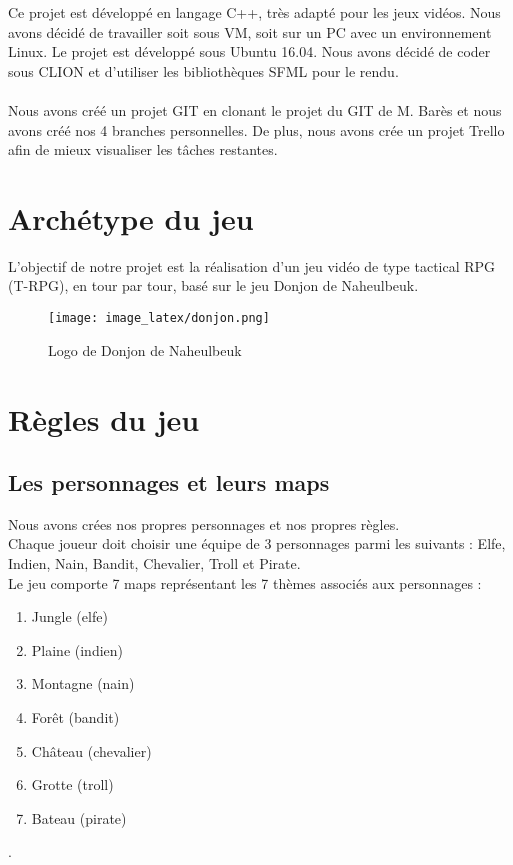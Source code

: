 \documentclass[a4paper,12pt]{report}
\begin{document}
		Ce projet est développé en langage C++, très adapté pour les jeux vidéos. Nous avons décidé de travailler soit sous VM, soit sur un PC avec un environnement Linux. Le projet est développé sous Ubuntu 16.04. Nous avons décidé de coder sous CLION et d'utiliser les bibliothèques SFML pour le rendu. \\ \\

		Nous avons créé un projet GIT en clonant le projet du GIT de M. Barès et nous avons créé nos 4 branches personnelles.
		De plus, nous avons crée un projet Trello afin de mieux visualiser les tâches restantes.
	
	
	
	
	
	\section{Archétype du jeu}
	L'objectif de notre projet est la réalisation d'un jeu vidéo de type tactical RPG (T-RPG), en tour par tour, basé sur le jeu Donjon de Naheulbeuk. 
	
	\begin{figure}[h]
		\centering
		\texttt{[image: image\_latex/donjon.png]}
		\caption{Logo de Donjon de Naheulbeuk}
	\end{figure}
	
	
	
	\section{Règles du jeu}
	
	
	\subsection{Les personnages et leurs maps}
	Nous avons crées nos propres personnages et nos propres règles.\\
	Chaque joueur doit choisir une équipe de 3 personnages parmi les suivants : Elfe, Indien, Nain, Bandit, Chevalier, Troll et Pirate.  \\

	\indent Le jeu comporte 7 maps représentant les 7 thèmes associés aux personnages : 
	\begin{enumerate}
		\item Jungle (elfe)
		\item Plaine (indien)
		\item Montagne (nain)
		\item Forêt (bandit)
		\item Château (chevalier)
		\item Grotte (troll)
		\item Bateau (pirate)
	\end{enumerate}	
	. \\ 
	
\end{document}
